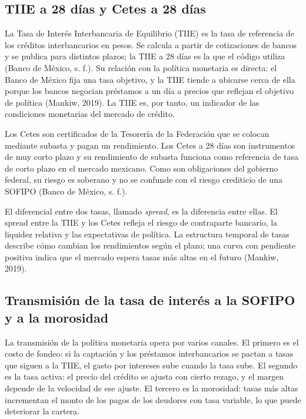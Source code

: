 \subsection{TIIE a 28 días y Cetes a 28 días}
La Tasa de Interés Interbancaria de Equilibrio (TIIE) es la tasa de referencia de los créditos interbancarios en pesos. Se calcula a partir de cotizaciones de bancos y se publica para distintos plazos; la TIIE a 28 días es la que el código utiliza (Banco de México, s. f.). Su relación con la política monetaria es directa: el Banco de México fija una tasa objetivo, y la TIIE tiende a ubicarse cerca de ella porque los bancos negocian préstamos a un día a precios que reflejan el objetivo de política (Mankiw, 2019). La TIIE es, por tanto, un indicador de las condiciones monetarias del mercado de crédito. %

Los Cetes son certificados de la Tesorería de la Federación que se colocan mediante subasta y pagan un rendimiento. Los Cetes a 28 días son instrumentos de muy corto plazo y su rendimiento de subasta funciona como referencia de tasa de corto plazo en el mercado mexicano. Como son obligaciones del gobierno federal, su riesgo es soberano y no se confunde con el riesgo crediticio de una SOFIPO (Banco de México, s. f.). %

El diferencial entre dos tasas, llamado \textit{spread}, es la diferencia entre ellas. El spread entre la TIIE y los Cetes refleja el riesgo de contraparte bancario, la liquidez relativa y las expectativas de política. La estructura temporal de tasas describe cómo cambian los rendimientos según el plazo; una curva con pendiente positiva indica que el mercado espera tasas más altas en el futuro (Mankiw, 2019).

\subsection{Transmisión de la tasa de interés a la SOFIPO y a la morosidad}
La transmisión de la política monetaria opera por varios canales. El primero es el costo de fondeo: si la captación y los préstamos interbancarios se pactan a tasas que siguen a la TIIE, el gasto por intereses sube cuando la tasa sube. El segundo es la tasa activa: el precio del crédito se ajusta con cierto rezago, y el margen depende de la velocidad de ese ajuste. El tercero es la morosidad: tasas más altas incrementan el monto de los pagos de los deudores con tasa variable, lo que puede deteriorar la cartera.

